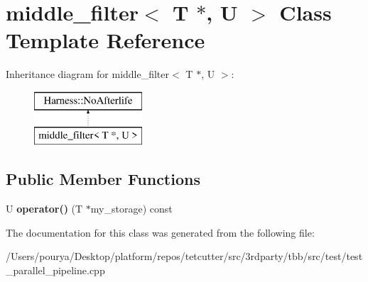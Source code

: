 \hypertarget{classmiddle__filter_3_01T_01_5_00_01U_01_4}{}\section{middle\+\_\+filter$<$ T $\ast$, U $>$ Class Template Reference}
\label{classmiddle__filter_3_01T_01_5_00_01U_01_4}
Inheritance diagram for middle\+\_\+filter$<$ T $\ast$, U $>$\+:\begin{figure}[H]
\begin{center}
\leavevmode
\includegraphics[height=2.000000cm]{classmiddle__filter_3_01T_01_5_00_01U_01_4}
\end{center}
\end{figure}
\subsection*{Public Member Functions}
\begin{DoxyCompactItemize}
\item 
\hypertarget{classmiddle__filter_3_01T_01_5_00_01U_01_4_ac70ba918a43f0677285eaa03474c907a}{}U {\bfseries operator()} (T $\ast$my\+\_\+storage) const \label{classmiddle__filter_3_01T_01_5_00_01U_01_4_ac70ba918a43f0677285eaa03474c907a}

\end{DoxyCompactItemize}


The documentation for this class was generated from the following file\+:\begin{DoxyCompactItemize}
\item 
/\+Users/pourya/\+Desktop/platform/repos/tetcutter/src/3rdparty/tbb/src/test/test\+\_\+parallel\+\_\+pipeline.\+cpp\end{DoxyCompactItemize}
